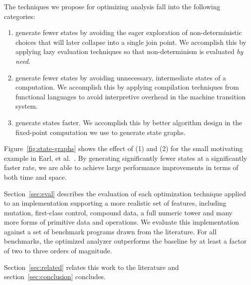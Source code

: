 \documentclass[9pt]{sigplanconf} %
\begin{document}
The techniques we propose for optimizing analysis fall into the following categories:
\begin{enumerate}
\item generate fewer states by avoiding the eager exploration of non-deterministic choices that will later collapse into a single join point.
%
  We accomplish this by applying lazy evaluation techniques so that non-determinism is evaluated \emph{by need}.

\item generate fewer states by avoiding unnecessary, intermediate states of a computation.
%
  We accomplish this by applying compilation techniques from functional languages to avoid interpretive overhead in the machine transition system.

\item generate states faster.
%
  We accomplish this by better algorithm design in the fixed-point computation we use to generate state graphs.
\end{enumerate}
%
Figure~\ref{fig:state-graphs} shows the effect of (1) and (2) for the small motivating example in Earl, et al.~\cite{dvanhorn:Earl2012Introspective}.
%
By generating significantly fewer states at a significantly faster rate, we are able to achieve large performance improvements in terms of both time and space.

Section~\ref{sec:eval} describes the evaluation of each optimization technique applied to an implementation supporting a more realistic set of features, including mutation, first-class control, compound data, a full numeric tower and many more forms of primitive data and operations.
%
We evaluate this implementation against a set of benchmark programs drawn from the literature.
%
For all benchmarks, the optimized analyzer outperforms the baseline by at least a factor of
two to
three orders of magnitude.

Section~\ref{sec:related} relates this work to the literature and section~\ref{sec:conclusion} concludes.
\end{document}
